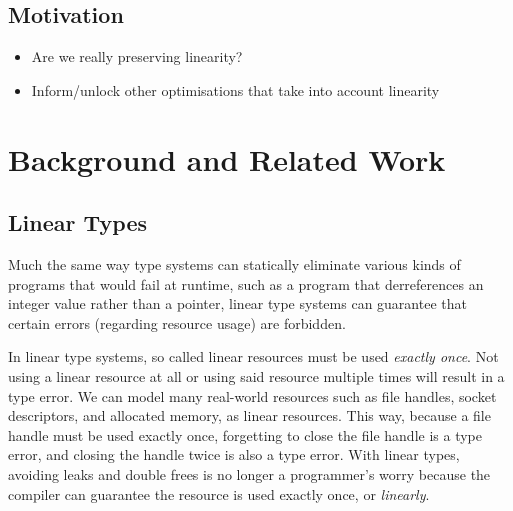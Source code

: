\documentclass[]{lwnovathesis}
\begin{document}



\section{Motivation}


\begin{itemize}
    \item Are we really preserving linearity?
    \item Inform/unlock other optimisations that take into account linearity
\end{itemize}


\chapter{Background and Related Work}

\section{Linear Types\label{sec:linear-types}}

Much the same way type systems can statically eliminate various kinds of
programs that would fail at runtime, such as a program that derreferences an
integer value rather than a pointer, linear type systems can guarantee that
certain errors (regarding resource usage) are forbidden.

In linear type systems, so called linear resources must be used \emph{exactly
once}. Not using a linear resource at all or using said resource multiple times
will result in a type error. We can model many real-world resources such as file
handles, socket descriptors, and allocated memory, as linear resources. This
way, because a file handle must be used exactly once, forgetting to close the
file handle is a type error, and closing the handle twice is also a type error.
With linear types, avoiding leaks and double frees is no longer a programmer's
worry because the compiler can guarantee the resource is used exactly once, or
\emph{linearly}.
\end{document}
